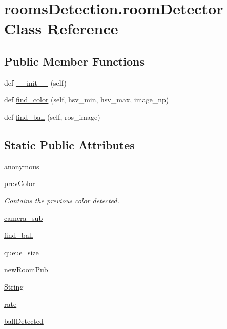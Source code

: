 \hypertarget{classroomsDetection_1_1roomDetector}{}\section{rooms\+Detection.\+room\+Detector Class Reference}
\label{classroomsDetection_1_1roomDetector}
\subsection*{Public Member Functions}
\begin{DoxyCompactItemize}
\item 
def \hyperlink{classroomsDetection_1_1roomDetector_add0b0abaacc02f93b27feaf8115fc8a8}{\+\_\+\+\_\+init\+\_\+\+\_\+} (self)
\item 
def \hyperlink{classroomsDetection_1_1roomDetector_a4130e10e997d3522ea7e8bde28b4ba44}{find\+\_\+color} (self, hsv\+\_\+min, hsv\+\_\+max, image\+\_\+np)
\item 
def \hyperlink{classroomsDetection_1_1roomDetector_a70f0932294849836dc74162457283a7b}{find\+\_\+ball} (self, ros\+\_\+image)
\end{DoxyCompactItemize}
\subsection*{Static Public Attributes}
\begin{DoxyCompactItemize}
\item 
\hyperlink{classroomsDetection_1_1roomDetector_ae2f844309806cb8eae1b5ce5e15f7f77}{anonymous}
\item 
\hyperlink{classroomsDetection_1_1roomDetector_af6e51a7b3c1edc0f77a0012ec2a0fd77}{prev\+Color}
\begin{DoxyCompactList}\small\item\em Contains the previous color detected. \end{DoxyCompactList}\item 
\hyperlink{classroomsDetection_1_1roomDetector_a04614c2d728c68e53458dd00177c6f85}{camera\+\_\+sub}
\item 
\hyperlink{classroomsDetection_1_1roomDetector_abc6a74f62df1b19dc26211c2f612f8b2}{find\+\_\+ball}
\item 
\hyperlink{classroomsDetection_1_1roomDetector_a45ffd5583c2c5b9754964fb80a3baad2}{queue\+\_\+size}
\item 
\hyperlink{classroomsDetection_1_1roomDetector_a2d67054a5aefed00c00d2fe83f8661bb}{new\+Room\+Pub}
\item 
\hyperlink{classroomsDetection_1_1roomDetector_a2d4775447d05df098592bf322c457a03}{String}
\item 
\hyperlink{classroomsDetection_1_1roomDetector_af9b73918d2c339e530129e12ad73fae2}{rate}
\item 
\hyperlink{classroomsDetection_1_1roomDetector_ab9794df752bec151d1c643eb4c7a7987}{ball\+Detected}
\end{DoxyCompactItemize}


